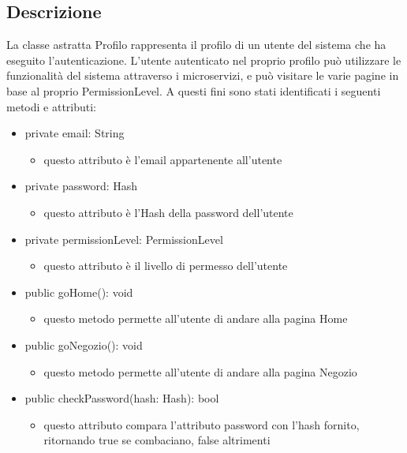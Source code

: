 \documentclass{report}
\begin{document}
\subsection*{Descrizione}
La classe astratta Profilo rappresenta il profilo di un utente del sistema che ha eseguito l'autenticazione.
L'utente autenticato nel proprio profilo può utilizzare le funzionalità del sistema attraverso i microservizi, e può visitare le varie pagine in base al proprio PermissionLevel. 
A questi fini sono stati identificati i seguenti metodi e attributi:
\begin{itemize}
	\item private email: String
	\begin{itemize}
		\item questo attributo è l'email appartenente all'utente
	\end{itemize}
	\item private password: Hash 
	\begin{itemize}
		\item questo attributo è l'Hash della password dell'utente
	\end{itemize}
	\item private permissionLevel: PermissionLevel 
	\begin{itemize}
		\item questo attributo è il livello di permesso dell'utente
	\end{itemize}
	\item public goHome(): void 
	\begin{itemize}
		\item questo metodo permette all'utente di andare alla pagina Home
	\end{itemize}
	\item public goNegozio(): void 
	\begin{itemize}
		\item questo metodo permette all'utente di andare alla pagina Negozio
	\end{itemize}
	\item public checkPassword(hash: Hash): bool 
	\begin{itemize}
		\item questo attributo compara l'attributo password con l'hash fornito, ritornando true se combaciano, false altrimenti
	\end{itemize}
\end{itemize}
\end{document}
